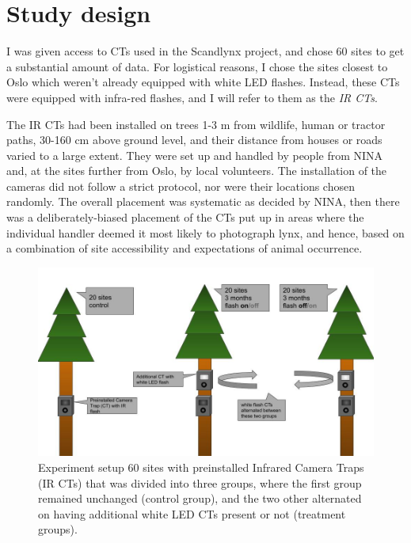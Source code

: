 \section{Study design} 

I was given access to CTs used in the Scandlynx project, and chose 60 sites to get a substantial amount of data.
For logistical reasons, I chose the sites closest to Oslo which weren't already equipped with white LED flashes. 
Instead, these CTs were equipped with infra-red flashes, and I will refer to them as the \emph{IR CTs}.


The IR CTs had been installed on trees 1-3 m from wildlife, human or tractor paths, 30-160 cm above ground level, and their distance from houses or roads varied to a large extent. %
They were set up and handled by people from NINA and, at the sites further from Oslo, by local volunteers. %
The installation of the cameras did not follow a strict protocol, nor were their locations chosen randomly. The overall placement was systematic as decided by NINA, then there was a deliberately-biased placement of the CTs put up in areas where the individual handler deemed it most likely to photograph lynx, and hence, based on a combination of site accessibility and expectations of animal occurrence. %


\begin{figure}
    \begin{center}
    	\includegraphics[scale=0.4]{./img/experiment_setup.jpg} %
    \end{center}
\caption[The Experimental setup]
    	{Experiment setup %
    	 60 sites with preinstalled Infrared Camera Traps (IR CTs) that was divided into three groups, where the first group remained unchanged (control group), and the two other alternated on having additional white LED CTs present or not (treatment groups).}
    \label{fig:exp_set}
\end{figure} 



